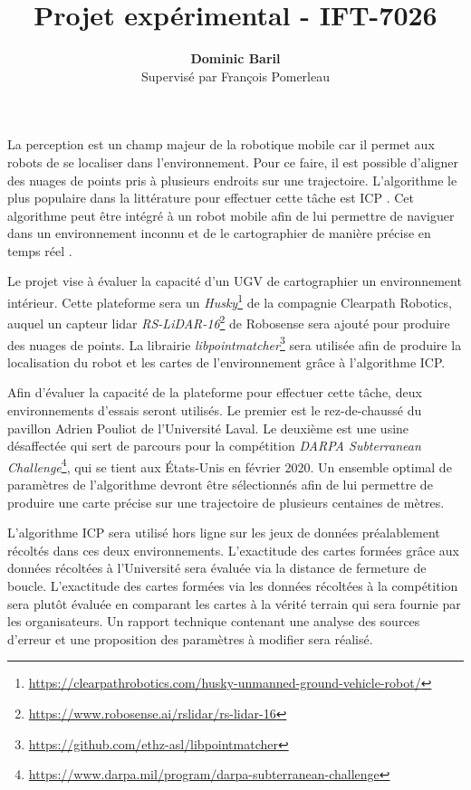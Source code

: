 \documentclass[12pt]{article}
\title{\vspace{-2.0cm} Projet expérimental - IFT-7026}
\author{\textbf{Dominic Baril} \\ \small Supervisé par François Pomerleau}
\date{\vspace{-5ex}}
\begin{document}
    \maketitle
     La perception est un champ majeur de la robotique mobile car il permet aux robots de se localiser dans l'environnement.
     Pour ce faire, il est possible d'aligner des nuages de points pris à plusieurs endroits sur une trajectoire. 
     L'algorithme le plus populaire dans la littérature pour effectuer cette tâche est \ac{ICP} \cite{Chen1991}. 
     Cet algorithme peut être intégré à un robot mobile afin de lui permettre de naviguer dans un environnement inconnu et de le cartographier de manière précise en temps réel \cite{Pomerleau2013, Pomerleau2015}. 
     
     \bigskip
     
     Le projet vise à évaluer la capacité d'un \ac{UGV} de cartographier un environnement intérieur.
     Cette plateforme sera un \textit{Husky}\footnote{\url{https://clearpathrobotics.com/husky-unmanned-ground-vehicle-robot/}} de la compagnie Clearpath Robotics, auquel un capteur lidar \textit{RS-LiDAR-16}\footnote{\url{https://www.robosense.ai/rslidar/rs-lidar-16}} de Robosense sera ajouté pour produire des nuages de points. 
     La librairie \textit{libpointmatcher}\footnote{\url{https://github.com/ethz-asl/libpointmatcher}} sera utilisée afin de produire la localisation du robot et les cartes de l'environnement grâce à l'algorithme \ac{ICP}. 
     
     
     \bigskip
     
     Afin d'évaluer la capacité de la plateforme pour effectuer cette tâche, deux environnements d'essais seront utilisés. 
     Le premier est le rez-de-chaussé du pavillon Adrien Pouliot de l'Université Laval. 
     Le deuxième est une usine désaffectée qui sert de parcours pour la compétition \textit{DARPA Subterranean Challenge}\footnote{\url{https://www.darpa.mil/program/darpa-subterranean-challenge}}, qui se tient aux États-Unis en février 2020.
     Un ensemble optimal de paramètres de l'algorithme devront être sélectionnés afin de lui permettre de produire une carte précise sur une trajectoire de plusieurs centaines de mètres.
     
     \bigskip
     
     L'algorithme ICP sera utilisé hors ligne sur les jeux de données préalablement récoltés dans ces deux environnements. 
     L'exactitude des cartes formées grâce aux données récoltées à l'Université sera évaluée via la distance de fermeture de boucle.
     L'exactitude des cartes formées via les données récoltées à la compétition sera plutôt évaluée en comparant les cartes à la vérité terrain qui sera fournie par les organisateurs.
     Un rapport technique contenant une analyse des sources d'erreur et une proposition des paramètres à modifier sera réalisé.
     
     \newpage
     \printbibliography[title=Références]
    
\end{document}
